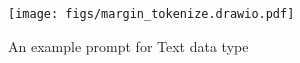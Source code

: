 \begin{figure}[h!]
    \centering
    \texttt{[image: figs/margin\_tokenize.drawio.pdf]}
    \vspace{-7pt}
    \caption{An example prompt for Text data type}
    \label{fig:text_example}
    \vspace{-10pt}
\end{figure}